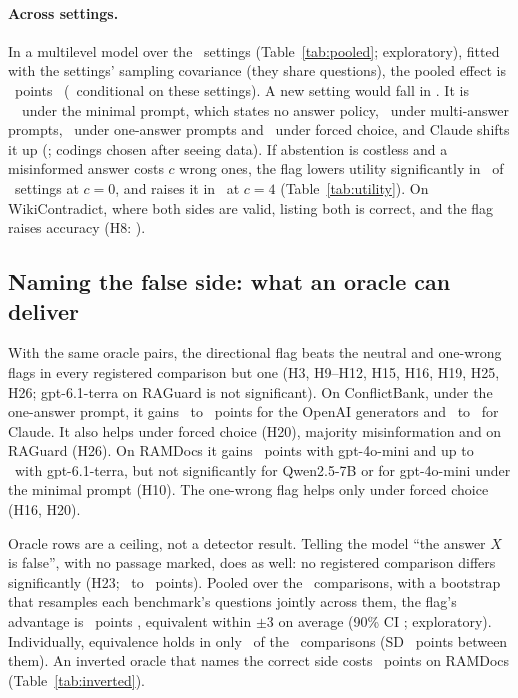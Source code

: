 \paragraph{Across settings.} In a multilevel model over the \neuMlK\ settings (Table~\ref{tab:pooled}; exploratory),
fitted with the settings' sampling covariance (they share questions), the pooled effect is \neuMlMu\ points
\neuMlCI\ (\neuMlCIDesign\ conditional on these settings). A new setting would fall in \neuMlPI. It is
\neuPolMinimal\ \neuPolMinimalCI\ under the minimal prompt, which states no answer policy, \neuPolMulti\ under
multi-answer prompts, \neuPolSingle\ under one-answer prompts and \neuPolForced\ under forced choice, and Claude
shifts it up (\neuMlAnthropic; codings chosen after seeing data). If abstention is costless and a misinformed answer
costs $c$ wrong ones, the flag lowers utility significantly in \nUtilSixNegZero\ of \nUtilSixSettings\ settings at
$c=0$, and raises it in \nUtilSixPosFour\ at $c=4$ (Table~\ref{tab:utility}). On WikiContradict, where both sides are valid, listing both is
correct, and the flag raises accuracy (H8: \wikiOracleFlag).

\subsection{Naming the false side: what an oracle can deliver}
\label{sec:direction}
With the same oracle pairs, the directional flag beats the neutral and one-wrong flags in every registered comparison
but one (H3, H9--H12, H15, H16, H19, H25, H26; gpt-6.1-terra on RAGuard is not significant). On ConflictBank, under
the one-answer prompt, it gains \azSgTerraOracleFlagDirectionalConflict\ to \azSgLunaOracleFlagDirectionalConflict\
points for the OpenAI generators and \azSgSonnetOracleFlagDirectionalConflict\ to
\azSgHaikuOracleFlagDirectionalConflict\ for Claude. It also helps under forced choice (H20), majority
misinformation and on RAGuard (H26). On RAMDocs it gains \adOracleDirConf\ points with gpt-4o-mini and
up to \azRdTerraOracleFlagDirectionalConflict\ with gpt-6.1-terra, but not significantly for Qwen2.5-7B or for
gpt-4o-mini under the minimal prompt (H10). The one-wrong flag helps only under forced choice (H16, H20).

Oracle rows are a ceiling, not a detector result. Telling the model ``the answer $X$ is false'', with no passage
marked, does as well: no registered comparison differs significantly (H23; \keyDiffMin\ to \keyDiffMax\ points).
Pooled over the \PoolTwentyThreeK\ comparisons, with a bootstrap that resamples each benchmark's questions jointly
across them, the flag's advantage is \PoolTwentyThree\ points \PoolTwentyThreeCI, equivalent within $\pm$3 on average
(90\% CI \PoolTwentyThreeCINinety; exploratory). Individually, equivalence holds in only \hTwentyThreeEqN\ of
the \hTwentyThreeK\ comparisons (SD \hTwentyThreeTau\ points between them). An inverted oracle
that names the correct side costs \aadvDirConf\ points on RAMDocs (Table~\ref{tab:inverted}).

